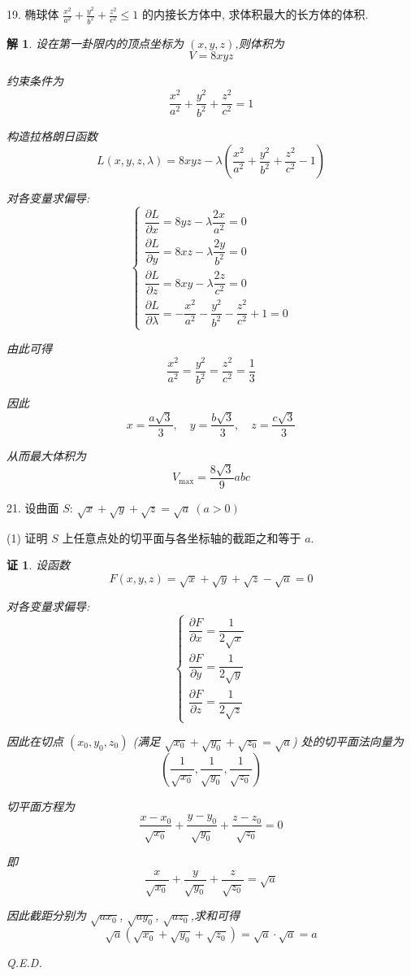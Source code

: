 \documentclass[a4paper,12pt]{article}
\newtheorem*{pf}{证}
\newtheorem*{sol}{解}
\begin{document}
19. 椭球体 $\frac{x^2}{a^2} + \frac{y^2}{b^2} + \frac{z^2}{c^2} \leq 1$ 的内接长方体中, 求体积最大的长方体的体积.
\begin{sol}
    设在第一卦限内的顶点坐标为 $(x,y,z)$,则体积为
    $$V=8xyz$$

    约束条件为
    $$\dfrac{x^2}{a^2} + \dfrac{y^2}{b^2} + \dfrac{z^2}{c^2} = 1$$

    构造拉格朗日函数
    $$L(x,y,z,\lambda)=8xyz-\lambda\left(\dfrac{x^2}{a^2} + \dfrac{y^2}{b^2} + \dfrac{z^2}{c^2} - 1\right)$$

    对各变量求偏导:
    $$\begin{cases}
            \dfrac{\partial L}{\partial x}=8yz-\lambda\dfrac{2x}{a^2}=0 \\[8pt]
            \dfrac{\partial L}{\partial y}=8xz-\lambda\dfrac{2y}{b^2}=0 \\[8pt]
            \dfrac{\partial L}{\partial z}=8xy-\lambda\dfrac{2z}{c^2}=0 \\[8pt]
            \dfrac{\partial L}{\partial \lambda}=-\dfrac{x^2}{a^2} - \dfrac{y^2}{b^2} - \dfrac{z^2}{c^2} + 1=0
        \end{cases}$$

    由此可得
    $$\dfrac{x^2}{a^2} = \dfrac{y^2}{b^2} = \dfrac{z^2}{c^2} = \dfrac{1}{3}$$

    因此
    $$x=\dfrac{a\sqrt{3}}{3},\quad y=\dfrac{b\sqrt{3}}{3},\quad z=\dfrac{c\sqrt{3}}{3}$$

    从而最大体积为
    $$V_{\max}=\dfrac{8\sqrt{3}}{9}abc$$
\end{sol}

21. 设曲面 $S$: $\sqrt{x} + \sqrt{y} + \sqrt{z} = \sqrt{a}\ (a > 0)$

(1) 证明 $S$ 上任意点处的切平面与各坐标轴的截距之和等于 $a$.
\begin{pf}
    设函数
    $$F(x,y,z)=\sqrt{x} + \sqrt{y} + \sqrt{z} - \sqrt{a}=0$$

    对各变量求偏导:
    $$\begin{cases}
            \dfrac{\partial F}{\partial x}=\dfrac{1}{2\sqrt{x}} \\[8pt]
            \dfrac{\partial F}{\partial y}=\dfrac{1}{2\sqrt{y}} \\[8pt]
            \dfrac{\partial F}{\partial z}=\dfrac{1}{2\sqrt{z}}
        \end{cases}$$

    因此在切点 $(x_0,y_0,z_0)$ (满足 $\sqrt{x_0} + \sqrt{y_0} + \sqrt{z_0} = \sqrt{a}$) 处的切平面法向量为
    $$\left(\dfrac{1}{\sqrt{x_0}}, \dfrac{1}{\sqrt{y_0}}, \dfrac{1}{\sqrt{z_0}}\right)$$

    切平面方程为
    $$\dfrac{x-x_0}{\sqrt{x_0}}+\dfrac{y-y_0}{\sqrt{y_0}}+\dfrac{z-z_0}{\sqrt{z_0}}=0$$

    即
    $$\dfrac{x}{\sqrt{x_0}}+\dfrac{y}{\sqrt{y_0}}+\dfrac{z}{\sqrt{z_0}}=\sqrt{a}$$

    因此截距分别为 $\sqrt{ax_0}$, $\sqrt{ay_0}$, $\sqrt{az_0}$,求和可得
    $$\sqrt{a}(\sqrt{x_0}+\sqrt{y_0}+\sqrt{z_0})=\sqrt{a} \cdot \sqrt{a}=a$$

    Q.E.D.
\end{pf}
\end{document}
